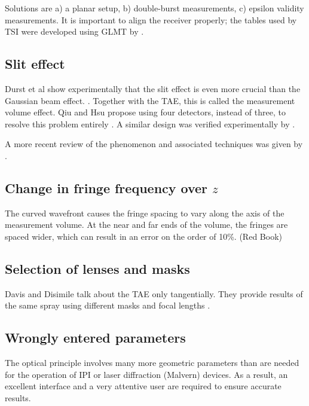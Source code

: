 \documentclass[10pt]{book}
\begin{document}
Solutions are a) a planar setup, b) double-burst measurements, c) epsilon
validity measurements. It is important to align the receiver properly; the
tables used by TSI were developed using GLMT by \citet{Naqwi96}.

\subsection{Slit effect}
Durst et al show experimentally that the slit effect is even more crucial than
the Gaussian beam effect. \cite{Durst94}. Together with the TAE, this
is called the measurement volume effect. Qiu and Hsu propose using four
detectors, instead of three, to resolve this problem entirely \cite{Qiu99}. A
similar design was verified experimentally by \citet{Sipperley14}.

A more recent review of the phenomenon and associated techniques was given by
\citet{Strakey00, Strakey01}.

\subsection{Change in fringe frequency over $z$}
The curved wavefront causes the fringe spacing to vary along the axis of the
measurement volume. At the near and far ends of the volume, the fringes are
spaced wider, which can result in an error on the order of 10\%. (Red Book)

\subsection{Selection of lenses and masks}
Davis and Disimile talk about the TAE only tangentially. They provide results of
the same spray using different masks and focal lengths \cite{Davis04}.

\subsection{Wrongly entered parameters}
The optical principle involves many more geometric parameters than are needed
for the operation of IPI or laser diffraction (Malvern) devices. As a result, an
excellent interface and a very attentive user are required to ensure accurate
results.
\end{document}

